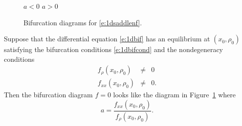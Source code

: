 \documentclass{ximera}
\begin{document}
\begin{figure}[htb]
           \centerline{%
	    \qquad \qquad
	   }
	 \hspace{1.0in} $a<0$ \hspace{2.8in}  $a>0$  
           \caption{Bifurcation diagrams for \protect\eqref{e:1dsaddlenf}.}
           \label{F:1dsaddle}
\end{figure}

\begin{theorem}  \label{T:saddlenode} 
Suppose that the differential equation \eqref{e:1dbif} has an equilibrium
at $(x_0,\rho_0)$ satisfying the bifurcation conditions \eqref{e:1dbifcond}
and the nondegeneracy conditions
\begin{equation}  \label{e:nondegen1}
\begin{array}{rcl} 
f_\rho(x_0,\rho_0) & \neq & 0 \\
f_{xx}(x_0,\rho_0) & \neq & 0. 
\end{array}
\end{equation}
Then the bifurcation diagram $f=0$ looks like the diagram in 
Figure~\ref{F:1dsaddle} where 
\[
a = \frac{f_{xx}(x_0,\rho_0)}{f_\rho(x_0,\rho_0)}.
\]
\end{theorem}
\end{document}
